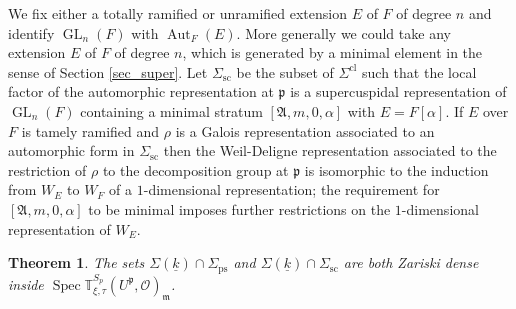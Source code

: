 \documentclass[11pt]{article}
\let\mathcal\mathscr
\newcommand{\rps}{\mathrm{ps}}
\newcommand{\rsc}{\mathrm{sc}}
\newtheorem{thm}[prop]{Theorem}
\theoremstyle{definition}
\DeclareMathOperator{\Aut}{Aut}
\DeclareMathOperator{\GL}{GL}
\DeclareMathOperator{\Spec}{Spec}
\newcommand{\Aa}{\mathfrak A}
\newcommand{\mm}{\mathfrak m}
\newcommand{\cO}{\mathcal{O}}
\newcommand{\TT}{\mathbb T}
\newcommand{\pp}{\mathfrak p}
\begin{document}
We fix either a totally ramified or unramified extension $E$ of $F$ of degree $n$ and identify $\GL_n(F)$ with $\Aut_F(E)$. More generally we could take
any extension $E$ of $F$ of degree $n$, which is generated by a minimal element in the sense of Section \ref{sec_super}. Let $\Sigma_{\rsc}$ be the subset
of $\Sigma^{\mathrm{cl}}$ such that the local factor of the automorphic representation at $\pp$ is a supercuspidal representation of $\GL_n(F)$ containing a
minimal stratum $[\Aa, m, 0, \alpha]$ with $E= F[\alpha]$. If $E$ over $F$ is tamely ramified and $\rho$ is a Galois representation associated to an automorphic form
in $\Sigma_{\rsc}$ then the Weil-Deligne representation associated to
the restriction of $\rho$ to the decomposition group at $\pp$ is isomorphic to the induction from $W_E$ to $W_F$ of a $1$-dimensional representation; the
requirement for $[\Aa, m, 0, \alpha]$ to be minimal
imposes further restrictions on the $1$-dimensional representation of $W_E$.

\begin{thm}\label{dense_hecke} The sets $\Sigma(\underline{k})\cap \Sigma_{\rps}$ and $\Sigma(\underline{k})\cap \Sigma_{\rsc}$ are both Zariski dense inside $\Spec \TT^{S_p}_{\xi, \tau}(U^{\pp}, \cO)_{\mm}$.
\end{thm}
\end{document}
